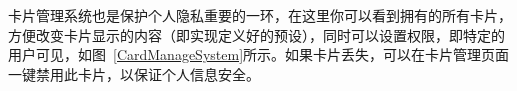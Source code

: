 \documentclass[UTF8]{ctexart}
\begin{document}
卡片管理系统也是保护个人隐私重要的一环，在这里你可以看到拥有的所有卡片，方便改变卡片显示的内容（即实现定义好的预设），同时可以设置权限，即特定的用户可见，如图~\ref{CardManageSystem}所示。如果卡片丢失，可以在卡片管理页面一键禁用此卡片，以保证个人信息安全。

\begin{figure}[htbp]
    \centering
\end{figure}
\end{document}
